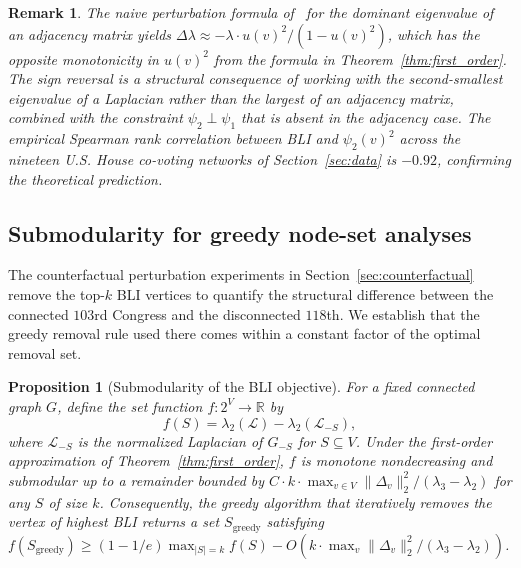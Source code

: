 \documentclass[12pt, a4paper]{article}
\newtheorem{proposition}{Proposition}
\newtheorem*{remark}{Remark}
\begin{document}
\begin{remark}
The naive perturbation formula of~\citet{restrepo2006characterizing} for the dominant eigenvalue of an adjacency matrix yields $\Delta\lambda \approx -\lambda \cdot u(v)^2 / (1 - u(v)^2)$, which has the opposite monotonicity in $u(v)^2$ from the formula in Theorem~\ref{thm:first_order}. The sign reversal is a structural consequence of working with the second-smallest eigenvalue of a Laplacian rather than the largest of an adjacency matrix, combined with the constraint $\psi_2 \perp \psi_1$ that is absent in the adjacency case. The empirical Spearman rank correlation between BLI and $\psi_2(v)^2$ across the nineteen U.S. House co-voting networks of Section~\ref{sec:data} is $-0.92$, confirming the theoretical prediction.
\end{remark}

\subsection{Submodularity for greedy node-set analyses}\label{subsec:bli_submodular}

The counterfactual perturbation experiments in Section~\ref{sec:counterfactual} remove the top-$k$ BLI vertices to quantify the structural difference between the connected $103$rd Congress and the disconnected $118$th. We establish that the greedy removal rule used there comes within a constant factor of the optimal removal set.

\begin{proposition}[Submodularity of the BLI objective]\label{prop:submodular}
For a fixed connected graph $G$, define the set function $f \colon 2^V \to \mathbb{R}$ by
\begin{equation}
f(S) = \lambda_2(\mathcal{L}) - \lambda_2(\mathcal{L}_{-S}),
\end{equation}
where $\mathcal{L}_{-S}$ is the normalized Laplacian of $G_{-S}$ for $S \subseteq V$. Under the first-order approximation of Theorem~\ref{thm:first_order}, $f$ is monotone nondecreasing and submodular up to a remainder bounded by $C \cdot k \cdot \max_{v \in V} \lVert \Delta_v \rVert_2^2 / (\lambda_3 - \lambda_2)$ for any $S$ of size $k$. Consequently, the greedy algorithm that iteratively removes the vertex of highest BLI returns a set $S_{\mathrm{greedy}}$ satisfying $f(S_{\mathrm{greedy}}) \geq (1 - 1/e) \max_{\lvert S \rvert = k} f(S) - O(k \cdot \max_v \lVert \Delta_v \rVert_2^2 / (\lambda_3 - \lambda_2))$.
\end{proposition}
\end{document}
